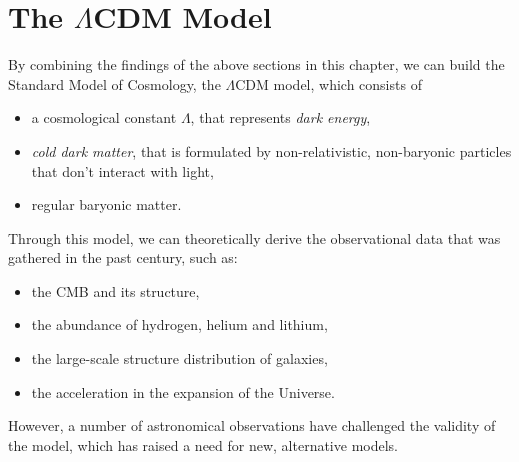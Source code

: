 \documentclass{book}
\begin{document}
	\section{The $\Lambda$CDM Model}
	By combining the findings of the above sections in this chapter, we can build the Standard Model of Cosmology, the $\Lambda$CDM model, which consists of 
	\begin{itemize}
		\item a cosmological constant $\Lambda$, that represents \textit{dark energy},
		\item \textit{cold dark matter}, that is formulated by non-relativistic, non-baryonic particles that don't interact with light, 
		\item regular baryonic matter.
	\end{itemize}
	Through this model, we can theoretically derive the observational data that was gathered in the past century, such as:
	\begin{itemize}
		\item the CMB and its structure,
		\item the abundance of hydrogen, helium and lithium,
		\item the large-scale structure distribution of galaxies,
		\item the acceleration in the expansion of the Universe.
	\end{itemize}
	However, a number of astronomical observations have challenged the validity of the model, which has raised a need for new, alternative models.
	
\end{document}
